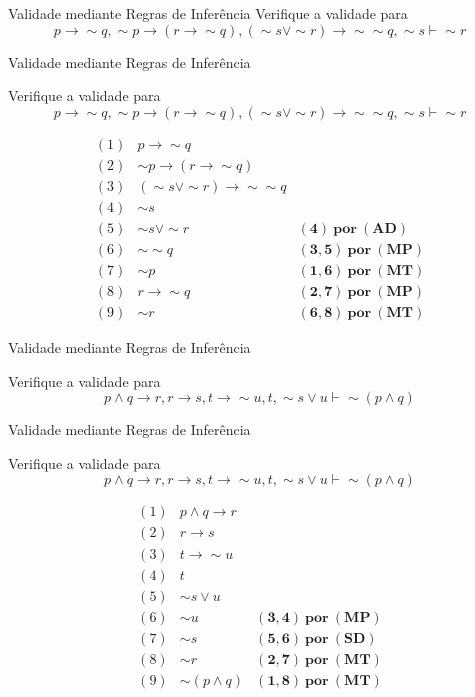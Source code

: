 \begin{frame}[t]{Validade mediante Regras de Inferência}
	Verifique a validade para $$p \rightarrow \sim q, \sim p \rightarrow (r \rightarrow\sim q), (\sim s \vee \sim r) \rightarrow \sim \sim q, \sim s \vdash \sim r$$
\end{frame}	


\begin{frame}[t]{Validade mediante Regras de Inferência}

	Verifique a validade para $$p \rightarrow \sim q, \sim p \rightarrow (r \rightarrow\sim q), (\sim s \vee \sim r) \rightarrow \sim \sim q, \sim s \vdash \sim r$$
	
	\vskip 0.5cm
	
	$$\begin{array}{lll}
	(1) & p \rightarrow \sim q  & \\
	(2) & \sim p \rightarrow (r \rightarrow\sim q) & \\
	(3) & (\sim s \vee \sim r) \rightarrow \sim \sim q & \\
	(4) & \sim s & \\
	\hline
	(5) & \sim s \vee\sim r & \mathbf{(4)~por~(AD)} \\
	(6) & \sim\sim q & \mathbf{(3,5)~por~(MP)} \\
	(7) & \sim p & \mathbf{(1,6)~por~(MT)} \\
	(8) & r \rightarrow\sim q  & \mathbf{(2,7)~por~(MP)} \\
	(9) & \sim r & \mathbf{(6,8)~por~(MT)}
	\end{array}$$	
\end{frame}


\begin{frame}[t]{Validade mediante Regras de Inferência}

	Verifique a validade para $$p \wedge q \rightarrow r, r \rightarrow s, t \rightarrow\sim u, t, \sim s \vee u \vdash \sim (p \wedge q)$$

\end{frame}


\begin{frame}[t]{Validade mediante Regras de Inferência}

	Verifique a validade para $$p \wedge q \rightarrow r, r \rightarrow s, t \rightarrow\sim u, t, \sim s \vee u \vdash \sim (p \wedge q)$$
	
	\vskip 0.5cm
	
	$$\begin{array}{lll}
	(1) & p \wedge q \rightarrow r  & \\
	(2) & r \rightarrow s & \\
	(3) & t \rightarrow\sim u & \\
	(4) & t & \\
	(5) & \sim s \vee u & \\
	\hline
	(6) & \sim u & \mathbf{(3,4)~por~(MP)} \\
	(7) & \sim s & \mathbf{(5,6)~por~(SD)} \\
	(8) & \sim r & \mathbf{(2,7)~por~(MT)} \\
	(9) & \sim (p \wedge q) & \mathbf{(1,8)~por~(MT)}
	\end{array}$$	
\end{frame}


